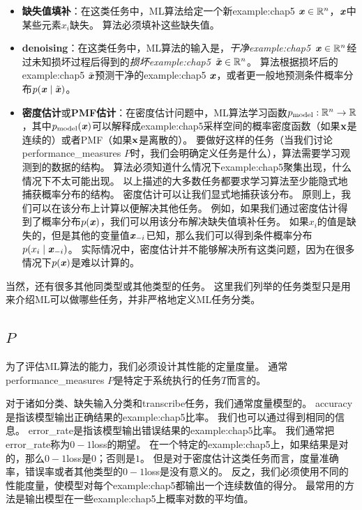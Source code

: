 \begin{itemize}
    \item \textbf{缺失值填补}：在这类任务中，\gls{ML}算法给定一个新\gls{example:chap5} $\boldsymbol{\mathit{x}}\in\mathbb{R}^n$，$\boldsymbol{\mathit{x}}$中某些元素$x_i$缺失。
    算法必须填补这些缺失值。


    \item \textbf{\gls{denoising}}：在这类任务中，\gls{ML}算法的输入是，\emph{干净\gls{example:chap5}}~$\boldsymbol{\mathit{x}} \in \mathbb{R}^n$经过未知损坏过程后得到的\emph{损坏\gls{example:chap5}}~$\tilde{\boldsymbol{\mathit{x}}} \in \mathbb{R}^n$。
    算法根据损坏后的\gls{example:chap5} $\tilde{\boldsymbol{\mathit{x}}}$预测干净的\gls{example:chap5} $\boldsymbol{\mathit{x}}$，或者更一般地预测条件概率分布$p(\boldsymbol{\mathit{x}}\mid\tilde{\boldsymbol{\mathit{x}}})$。
    
    \item \textbf{密度估计}或\textbf{\gls{PMF}估计}：在密度估计问题中，\gls{ML}算法学习函数$p_{\text{model}}:\mathbb{R}^n \to \mathbb{R}$，其中$p_{\text{model}}(\boldsymbol{\mathit{x}})$可以解释成\gls{example:chap5}采样空间的概率密度函数（如果$\mathbf{x}$是连续的）或者\gls{PMF}（如果$\mathbf{x}$是离散的）。
    要做好这样的任务（当我们讨论\gls{performance_measures} $P$时，我们会明确定义任务是什么），算法需要学习观测到的数据的结构。
    算法必须知道什么情况下\gls{example:chap5}聚集出现，什么情况下不太可能出现。
    以上描述的大多数任务都要求学习算法至少能隐式地捕获概率分布的结构。
    密度估计可以让我们显式地捕获该分布。
    原则上，我们可以在该分布上计算以便解决其他任务。
    例如，如果我们通过密度估计得到了概率分布$p(\boldsymbol{\mathit{x}})$，我们可以用该分布解决缺失值填补任务。
    如果$x_i$的值是缺失的，但是其他的变量值$\boldsymbol{\mathit{x}}_{-i}$已知，那么我们可以得到条件概率分布$p(x_i\mid\boldsymbol{\mathit{x}}_{-i})$。
    实际情况中，密度估计并不能够解决所有这类问题，因为在很多情况下$p(\boldsymbol{\mathit{x}})$是难以计算的。
\end{itemize}

当然，还有很多其他同类型或其他类型的任务。
这里我们列举的任务类型只是用来介绍\gls{ML}可以做哪些任务，并非严格地定义\gls{ML}任务分类。

\subsection{ $P$}
\label{sec:the_performance_measure_p}
为了评估\gls{ML}算法的能力，我们必须设计其性能的定量度量。
通常\gls{performance_measures} $P$是特定于系统执行的任务$T$而言的。

对于诸如分类、缺失输入分类和\gls{transcribe}任务，我们通常度量模型的。
\gls{accuracy}是指该模型输出正确结果的\gls{example:chap5}比率。
我们也可以通过得到相同的信息。
\gls{error_rate}是指该模型输出错误结果的\gls{example:chap5}比率。
我们通常把\gls{error_rate}称为$0-1$\gls{loss}的期望。
在一个特定的\gls{example:chap5}上，如果结果是对的，那么$0-1$\gls{loss}是$0$；否则是$1$。
但是对于密度估计这类任务而言，度量准确率，错误率或者其他类型的$0-1$\gls{loss}是没有意义的。
反之，我们必须使用不同的性能度量，使模型对每个\gls{example:chap5}都输出一个连续数值的得分。
最常用的方法是输出模型在一些\gls{example:chap5}上概率对数的平均值。


